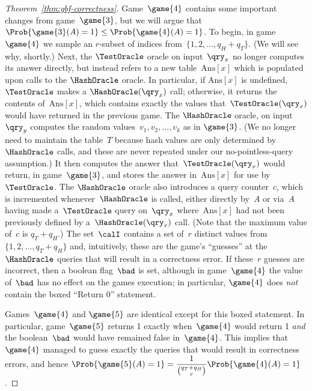 \begin{proof}[Theorem~\ref{thm:gbf-correctness}]
Game~$\game{4}$ contains some important changes from game~$\game{3}$, but we will argue that $\Prob{\game{3}(A) = 1} \leq \Prob{\game{4}(A) = 1}$.  To begin, in game~$\game{4}$ we sample an $r$-subset of indices from~$\{1,2,\ldots,q_H+q_T\}$.  (We will see why, shortly.)  Next, the $\TestOracle$ oracle on input~$\qry_x$ no longer computes its answer directly, but instead refers to a new table~$\mathrm{Ans}[x]$ which is populated upon calls to the $\HashOracle$ oracle.  In particular, if $\mathrm{Ans}[x]$ is undefined, $\TestOracle$ makes a $\HashOracle(\qry_x)$ call; otherwise, it returns the contents of~$\mathrm{Ans}[x]$, which contains exactly the values that~$\TestOracle(\qry_x)$ would have returned in the previous game.  The $\HashOracle$ oracle, on input~$\qry_y$ computes the random values~$v_1,v_2,\ldots,v_k$ as in $\game{3}$.  (We no longer need to maintain the table~$T$ because hash values are only determined by~$\HashOracle$ calls, and these are never repeated under our no-pointless-query assumption.)  It then computes the answer that~$\TestOracle(\qry_x)$ would return, in game~$\game{3}$, and stores the answer in~$\mathrm{Ans}[x]$ for use by~$\TestOracle$.  The $\HashOracle$ oracle also introduces a query counter~$c$, which is incremented whenever~$\HashOracle$ is called, either directly by~$A$ or via~$A$ having made a~$\TestOracle$ query on~$\qry_x$ where~$\mathrm{Ans}[x]$ had not been previously defined by a~$\HashOracle(\qry_x)$ call.    (Note that the maximum value of~$c$ is $q_T + q_H$.)  The set~$\calI$ contains a set of~$r$ distinct values from $\{1,2,\ldots,q_T+q_H\}$ and, intuitively, these are the game's ``guesses'' at the $\HashOracle$ queries that will result in a correctness error.  If these~$r$ guesses are incorrect, then a boolean flag~$\bad$ is set, although in game~$\game{4}$ the value of~$\bad$ has no effect on the games execution; in particular, $\game{4}$ does \emph{not} contain the boxed ``Return 0'' statement.

Games~$\game{4}$ and $\game{5}$ are identical except for this boxed statement.  In particular, game~$\game{5}$ returns 1 exactly when~$\game{4}$ would return 1 \emph{and} the boolean~$\bad$ would have remained false in~$\game{4}$.   This implies that~$\game{4}$ managed to guess exactly the queries that would result in correctness errors, and hence
$\Prob{\game{5}(A)=1} = \dfrac{1}{\binom{q_T + q_H}{r}}\Prob{\game{4}(A)=1}$.


\end{proof}
